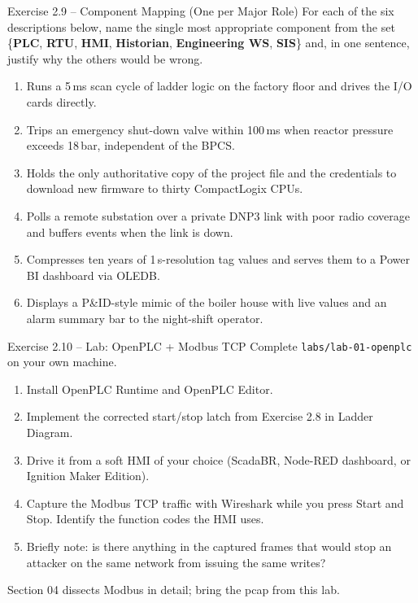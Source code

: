 \documentclass[11pt,a4paper]{article}
\begin{document}
\begin{taskbox}{Exercise 2.9 -- Component Mapping (One per Major Role)}
For each of the six descriptions below, name the single most appropriate
component from the set
\{\textbf{PLC}, \textbf{RTU}, \textbf{HMI}, \textbf{Historian},
\textbf{Engineering WS}, \textbf{SIS}\} and, in one sentence, justify why
the others would be wrong.
\begin{enumerate}
  \item Runs a 5\,ms scan cycle of ladder logic on the
    factory floor and drives the I/O cards directly.
  \item Trips an emergency shut-down valve within 100\,ms
    when reactor pressure exceeds 18\,bar, independent of the BPCS.
  \item Holds the only authoritative copy of the project file and the
    credentials to download new firmware to thirty CompactLogix CPUs.
  \item Polls a remote substation over a private DNP3 link with poor
    radio coverage and buffers events when the link is down.
  \item Compresses ten years of 1\,s-resolution tag values and
    serves them to a Power BI dashboard via OLEDB.
  \item Displays a P\&ID-style mimic of the boiler house with live values
    and an alarm summary bar to the night-shift operator.
\end{enumerate}
\end{taskbox}

\begin{taskbox}{Exercise 2.10 -- Lab: OpenPLC + Modbus TCP}
Complete \texttt{labs/lab-01-openplc} on your own machine.
\begin{enumerate}
  \item Install OpenPLC Runtime and OpenPLC Editor.
  \item Implement the corrected start/stop latch from Exercise 2.8 in
    Ladder Diagram.
  \item Drive it from a soft HMI of your choice (ScadaBR, Node-RED
    dashboard, or Ignition Maker Edition).
  \item Capture the Modbus TCP traffic with Wireshark while you press
    Start and Stop. Identify the function codes the HMI uses.
  \item Briefly note: is there anything in the captured frames that would
    stop an attacker on the same network from issuing the same writes?
\end{enumerate}
\begin{hintbox}
Section 04 dissects Modbus in detail; bring the pcap from this lab.
\end{hintbox}
\end{taskbox}
\end{document}
